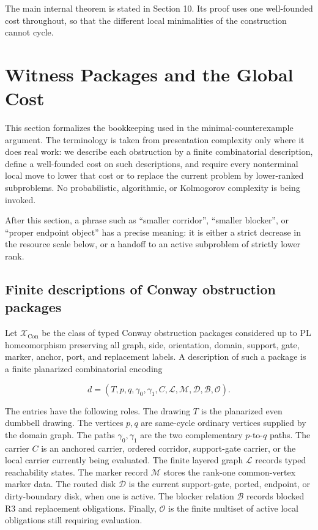 \documentclass[11pt]{amsart}
\theoremstyle{definition}
\begin{document}
The main internal theorem is stated in Section 10. Its proof uses one
well-founded cost throughout, so that the different local minimalities of the
construction cannot cycle.

\section{Witness Packages and the Global Cost}

This section formalizes the bookkeeping used in the minimal-counterexample
argument. The terminology is taken from presentation complexity only where it
does real work: we describe each obstruction by a finite combinatorial
description, define a well-founded cost on such descriptions, and require every
nonterminal local move to lower that cost or to replace the current problem by
lower-ranked subproblems. No probabilistic, algorithmic, or Kolmogorov
complexity is being invoked.

After this section, a phrase such as ``smaller corridor'', ``smaller blocker'', or
``proper endpoint object'' has a precise meaning: it is either a strict decrease
in the resource scale below, or a handoff to an active subproblem of strictly
lower rank.

\subsection{Finite descriptions of Conway obstruction packages}

Let \(\mathcal X_{\mathrm{Con}}\) be the class of typed Conway obstruction packages considered up to PL homeomorphism preserving all graph, side, orientation, domain, support, gate, marker, anchor, port, and replacement labels. A description of such a package is a finite planarized combinatorial encoding

\[
d=
(T,p,q,\gamma_0,\gamma_1,C,\mathcal L,\mathcal M,\mathcal D,\mathcal B,\mathcal O).
\]

The entries have the following roles. The drawing \(T\) is the planarized even
dumbbell drawing. The vertices \(p,q\) are same-cycle ordinary vertices supplied
by the domain graph. The paths \(\gamma_0,\gamma_1\) are the two complementary
\(p\)-to-\(q\) paths. The carrier \(C\) is an anchored carrier, ordered corridor,
support-gate carrier, or the local carrier currently being evaluated. The
finite layered graph \(\mathcal L\) records typed reachability states. The marker
record \(\mathcal M\) stores the rank-one common-vertex marker data. The routed
disk \(\mathcal D\) is the current support-gate, ported, endpoint, or
dirty-boundary disk, when one is active. The blocker relation \(\mathcal B\)
records blocked R3 and replacement obligations. Finally, \(\mathcal O\) is the
finite multiset of active local obligations still requiring evaluation.
\end{document}
